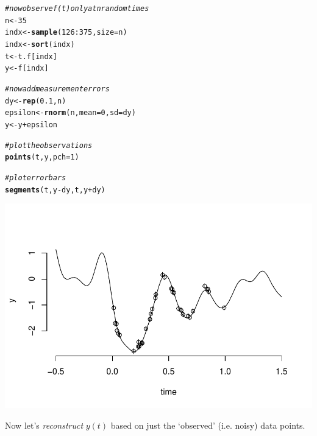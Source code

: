 \documentclass[a4paper, 11pt, amsmath, graphicx]{article}\usepackage[]{graphicx}\usepackage[]{color}
\makeatletter
\def\maxwidth{ %
  \ifdim\Gin@nat@width>\linewidth
    \linewidth
  \else
    \Gin@nat@width
  \fi
}
\newcommand{\hlnum}[1]{\textcolor[rgb]{0.686,0.059,0.569}{#1}}%
\newcommand{\hlcom}[1]{\textcolor[rgb]{0.678,0.584,0.686}{\textit{#1}}}%
\newcommand{\hlopt}[1]{\textcolor[rgb]{0,0,0}{#1}}%
\newcommand{\hlstd}[1]{\textcolor[rgb]{0.345,0.345,0.345}{#1}}%
\newcommand{\hlkwb}[1]{\textcolor[rgb]{0.69,0.353,0.396}{#1}}%
\newcommand{\hlkwc}[1]{\textcolor[rgb]{0.333,0.667,0.333}{#1}}%
\newcommand{\hlkwd}[1]{\textcolor[rgb]{0.737,0.353,0.396}{\textbf{#1}}}%
\newenvironment{kframe}{%
 \def\at@end@of@kframe{}%
 \ifinner\ifhmode%
  \def\at@end@of@kframe{\end{minipage}}%
  \begin{minipage}{\columnwidth}%
 \fi\fi%
 \def\FrameCommand##1{\hskip\@totalleftmargin \hskip-\fboxsep
 \colorbox{shadecolor}{##1}\hskip-\fboxsep
     \hskip-\linewidth \hskip-\@totalleftmargin \hskip\columnwidth}%
 \MakeFramed {\advance\hsize-\width
   \@totalleftmargin\z@ \linewidth\hsize
   \@setminipage}}%
 {\par\unskip\endMakeFramed%
 \at@end@of@kframe}
\newenvironment{knitrout}{}{} %
\makeatother
\begin{document}
\begin{knitrout}
\color{fgcolor}\begin{kframe}
\begin{alltt}
\hlcom{# now observe f(t) only at n random times}
\hlstd{n} \hlkwb{<-} \hlnum{35}
\hlstd{indx} \hlkwb{<-} \hlkwd{sample}\hlstd{(}\hlnum{126}\hlopt{:}\hlnum{375}\hlstd{,} \hlkwc{size} \hlstd{= n)}
\hlstd{indx} \hlkwb{<-} \hlkwd{sort}\hlstd{(indx)}
\hlstd{t} \hlkwb{<-} \hlstd{t.f[indx]}
\hlstd{y} \hlkwb{<-} \hlstd{f[indx]}

\hlcom{# now add measurement errors}
\hlstd{dy} \hlkwb{<-} \hlkwd{rep}\hlstd{(}\hlnum{0.1}\hlstd{, n)}
\hlstd{epsilon} \hlkwb{<-} \hlkwd{rnorm}\hlstd{(n,} \hlkwc{mean} \hlstd{=} \hlnum{0}\hlstd{,} \hlkwc{sd} \hlstd{= dy)}
\hlstd{y} \hlkwb{<-} \hlstd{y} \hlopt{+} \hlstd{epsilon}

\hlcom{# plot the observations}
\hlkwd{points}\hlstd{(t, y,} \hlkwc{pch} \hlstd{=} \hlnum{1}\hlstd{)}

\hlcom{# plot error bars}
\hlkwd{segments}\hlstd{(t, y}\hlopt{-}\hlstd{dy, t, y}\hlopt{+}\hlstd{dy)}
\end{alltt}
\end{kframe}

{\centering \includegraphics[width=\maxwidth]{figure/unnamed-chunk-5-1} 

}



\end{knitrout}

Now let's \emph{reconstruct} $y(t)$ based on just the `observed' (i.e. noisy) data points.
\end{document}
